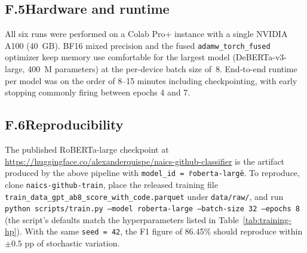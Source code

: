 \subsection*{F.5\quad Hardware and runtime}
All six runs were performed on a Colab Pro+ instance with a single NVIDIA A100 (40~GB). BF16 mixed precision and the fused \texttt{adamw\_torch\_fused} optimizer keep memory use comfortable for the largest model (DeBERTa-v3-large, 400~M parameters) at the per-device batch size of~8. End-to-end runtime per model was on the order of 8--15 minutes including checkpointing, with early stopping commonly firing between epochs 4 and 7.

\subsection*{F.6\quad Reproducibility}
The published RoBERTa-large checkpoint at \url{https://huggingface.co/alexanderquispe/naics-github-classifier} is the artifact produced by the above pipeline with \texttt{model\_id = \"roberta-large\"}. To reproduce, clone \texttt{naics-github-train}, place the released training file \texttt{train\_data\_gpt\_ab8\_score\_with\_code.parquet} under \texttt{data/raw/}, and run \texttt{python scripts/train.py --model roberta-large --batch-size 32 --epochs 8} (the script's defaults match the hyperparameters listed in Table~\ref{tab:training-hp}). With the same \texttt{seed = 42}, the F1 figure of 86.45\% should reproduce within $\pm 0.5$ pp of stochastic variation.
